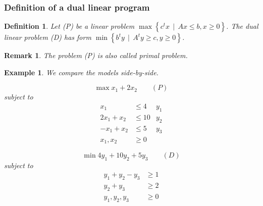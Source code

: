 \documentclass[a4paper]{article}
\numberwithin{lecref}{subsection}
\newcounter{exercises}
\newtheorem{example}[exercises]{Example}
\newtheorem*{Definition}{Definition}
\newtheorem*{Remark}{Remark}
\newcommand{\SetDef}[2]{\left\{#1\,\mid\,#2\right\}}
\begin{document}
\subsubsection{Definition of a dual linear program}

\begin{Definition}
	Let (P) be a linear problem $\max\SetDef{c^tx}{Ax \leq b, x \geq 0}$.
	The dual linear problem (D) has form $\min\SetDef{b^t y}{A^ty \geq c, y \geq 0}$.
\end{Definition}

\begin{Remark}
	The problem (P) is also called \emph{primal problem}.
\end{Remark}

\begin{example}
	\label{example:4.1}
	We compare the models side-by-side.

	\begin{minipage}{0.49\textwidth}
		\[ \max x_1 + 2x_2 \qquad (P) \]
		subject to
		\begin{align*}
			x_1 &\leq 4          & y_1 \\
			2x_1 + x_2 &\leq 10  & y_2 \\
			-x_1 + x_2 &\leq 5   & y_3 \\
			x_1, x_2 &\geq 0
		\end{align*}
	\end{minipage}
	\begin{minipage}{0.49\textwidth}
		\[ \min 4y_1 + 10y_2 + 5y_3 \qquad (D) \]
		subject to
		\begin{align*}
			y_1  + y_2 - y_3 &\geq 1 \\
			y_2 + y_3 &\geq 2 \\
			y_1, y_2, y_3 &\geq 0
		\end{align*}
	\end{minipage}
\end{example}
\end{document}
